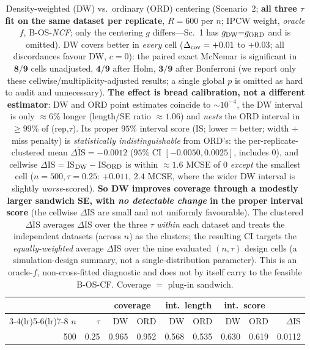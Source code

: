 \begin{table}[t]\centering\small
\caption{Density-weighted (DW) vs.\ ordinary (ORD) centering (Scenario~2; \textbf{all three $\tau$ fit on the same dataset per replicate}, $R=600$ per $n$; IPCW weight, \emph{oracle} $f$, B-OS-\emph{NCF}; only the centering $g$ differs---Sc.~1 has $g_{\rm DW}{=}g_{\rm ORD}$ and is omitted). DW covers better in \emph{every} cell ($\Delta_{\rm cov}=+0.01$ to $+0.03$; all discordances favour DW, $c{=}0$): the paired exact McNemar is significant in $\mathbf{8/9}$ cells unadjusted, $\mathbf{4/9}$ after Holm, $\mathbf{3/9}$ after Bonferroni (we report only these cellwise/multiplicity-adjusted results; a single global $p$ is omitted as hard to audit and unnecessary). \textbf{The effect is bread calibration, not a different estimator}: DW and ORD point estimates coincide to $\sim10^{-4}$, the DW interval is only $\approx6\%$ longer (length/SE ratio $\approx1.06$) and \emph{nests} the ORD interval in $\ge99\%$ of (rep,$\tau$). Its proper $95\%$ interval score (IS; lower$=$better; width $+$ miss penalty) is \emph{statistically indistinguishable} from ORD's: the per-replicate-clustered mean $\overline{\Delta\mathrm{IS}}=-0.0012$ ($95\%$ CI $[-0.0050,0.0025]$, includes $0$), and cellwise $\Delta\mathrm{IS}={}$IS$_{\rm DW}-{}$IS$_{\rm ORD}$ is within $\approx1.6$ MCSE of $0$ \emph{except} the smallest cell ($n{=}500,\tau{=}0.25$: $+0.011$, $2.4$ MCSE, where the wider DW interval is slightly \emph{worse}-scored). \textbf{So DW improves coverage through a modestly larger sandwich SE, with \emph{no detectable change} in the proper interval score} (the cellwise $\Delta$IS are small and not uniformly favourable). The clustered $\overline{\Delta\mathrm{IS}}$ averages $\Delta$IS over the three $\tau$ \emph{within} each dataset and treats the independent datasets (across $n$) as the clusters; the resulting CI targets the \emph{equally-weighted} average $\Delta$IS over the nine evaluated $(n,\tau)$ design cells (a simulation-design summary, not a single-distribution parameter). This is an oracle-$f$, non-cross-fitted diagnostic and does not by itself carry to the feasible B-OS-CF. Coverage $=$ plug-in sandwich.}
\label{tab:ordcenter}\begin{tabular}{rr rr rr rr r}\toprule
&&\multicolumn{2}{c}{coverage}&\multicolumn{2}{c}{int.\ length}&\multicolumn{2}{c}{int.\ score}&\\
\cmidrule(lr){3-4}\cmidrule(lr){5-6}\cmidrule(lr){7-8}
$n$&$\tau$&DW&ORD&DW&ORD&DW&ORD&$\Delta$IS\\\midrule
500 & 0.25 & 0.965 & 0.952 & 0.568 & 0.535 & 0.630 & 0.619 & 0.0112 \\

\end{tabular}
\end{table}
